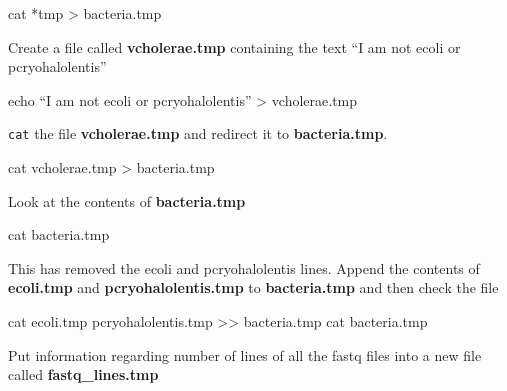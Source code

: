 \documentclass[
  letterpaper,
  DIV=11,
  numbers=noendperiod]{scrreprt}
\newenvironment{Shaded}{\begin{snugshade}}{\end{snugshade}}
\newcommand{\BuiltInTok}[1]{\textcolor[rgb]{0.00,0.23,0.31}{#1}}
\newcommand{\FunctionTok}[1]{\textcolor[rgb]{0.28,0.35,0.67}{#1}}
\newcommand{\NormalTok}[1]{\textcolor[rgb]{0.00,0.23,0.31}{#1}}
\newcommand{\OperatorTok}[1]{\textcolor[rgb]{0.37,0.37,0.37}{#1}}
\newcommand{\PreprocessorTok}[1]{\textcolor[rgb]{0.68,0.00,0.00}{#1}}
\begin{document}
\begin{Shaded}
\begin{Highlighting}[]
\FunctionTok{cat} \PreprocessorTok{*}\NormalTok{tmp }\OperatorTok{\textgreater{}}\NormalTok{ bacteria.tmp}
\end{Highlighting}
\end{Shaded}

Create a file called \textbf{vcholerae.tmp} containing the text ``I am
not ecoli or pcryohalolentis''

\begin{Shaded}
\begin{Highlighting}[]
\BuiltInTok{echo}\NormalTok{ “I am not ecoli or pcryohalolentis” }\OperatorTok{\textgreater{}}\NormalTok{ vcholerae.tmp}
\end{Highlighting}
\end{Shaded}

\texttt{cat} the file \textbf{vcholerae.tmp} and redirect it to
\textbf{bacteria.tmp}.

\begin{Shaded}
\begin{Highlighting}[]
\FunctionTok{cat}\NormalTok{ vcholerae.tmp }\OperatorTok{\textgreater{}}\NormalTok{ bacteria.tmp}
\end{Highlighting}
\end{Shaded}

Look at the contents of \textbf{bacteria.tmp}

\begin{Shaded}
\begin{Highlighting}[]
\FunctionTok{cat}\NormalTok{ bacteria.tmp}
\end{Highlighting}
\end{Shaded}

This has removed the ecoli and pcryohalolentis lines. Append the
contents of \textbf{ecoli.tmp} and \textbf{pcryohalolentis.tmp} to
\textbf{bacteria.tmp} and then check the file

\begin{Shaded}
\begin{Highlighting}[]
\FunctionTok{cat}\NormalTok{ ecoli.tmp pcryohalolentis.tmp }\OperatorTok{\textgreater{}\textgreater{}}\NormalTok{ bacteria.tmp}
\FunctionTok{cat}\NormalTok{ bacteria.tmp}
\end{Highlighting}
\end{Shaded}

Put information regarding number of lines of all the fastq files into a
new file called \textbf{fastq\_lines.tmp}
\end{document}
